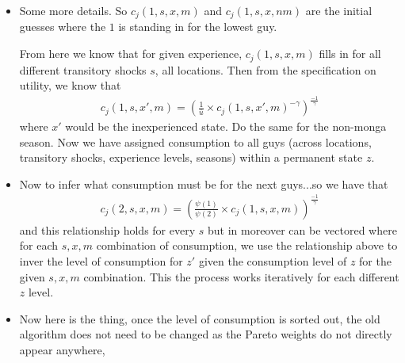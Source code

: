 \documentclass[12pt,pdftex]{article}
\begin{document}
\begin{onehalfspacing}
\begin{itemize}
\item Some more details. So $c_{j}(1, s, x, m)$ and $c_{j}(1, s, x, nm)$  are the initial guesses where the $1$ is standing in for the lowest guy. 

From here we know that for given experience, $c_{j}(1, s, x, m)$ fills in for all different transitory shocks $s$, all locations. Then from the specification on utility, we know that
\begin{align}
c_{j}(1, s, x', m)  = \left( \frac{1}{\bar u} \times c_{j}(1, s, x', m)^{-\gamma} \right)^{\frac{-1}{\gamma}}
\end{align}
where $x'$ would be the inexperienced state. Do the same for the non-monga season. Now we have assigned consumption to all guys (across locations, transitory shocks, experience levels, seasons) within a permanent state $z$. 
    
\item Now to infer what consumption must be for the next guys...so we have that 
\begin{align}
c_{j}(2, s, x, m) = \left( \frac{\psi(1)}{\psi(2)} \times  c_{j}(1, s, x, m) \right)^{\frac{-1}{\gamma}}
\end{align}
and this relationship holds for every $s$ but in moreover can be vectored where for each $s,x,m$ combination of consumption, we use the relationship above to inver the level of consumption for $z'$ given the consumption level of $z$ for the given $s,x,m$ combination. This the process works iteratively for each different $z$ level. 

\item Now here is the thing, once the level of consumption is sorted out, the old algorithm does not need to be changed as the Pareto weights do not directly appear anywhere, 

\end{itemize}

\newpage






\end{onehalfspacing}
\end{document}
